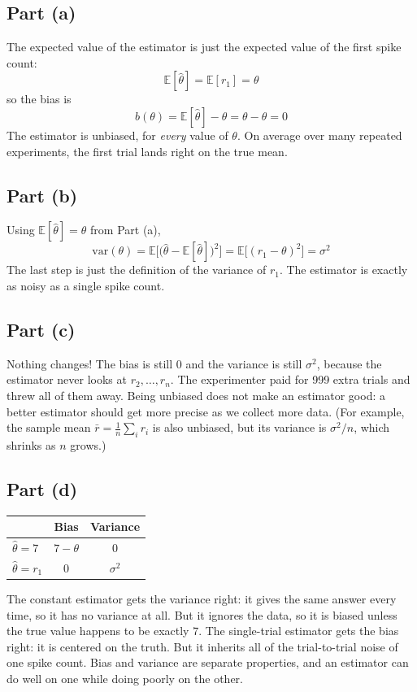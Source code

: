 \documentclass[11pt]{article}
\begin{document}
\subsection*{Part (a)}
The expected value of the estimator is just the expected value of the first spike count:
\[
\mathbb{E}[\hat{\theta}]=\mathbb{E}[r_1]=\theta
\]
so the bias is
\[
b(\theta)=\mathbb{E}[\hat{\theta}]-\theta=\theta-\theta=0
\]
The estimator is unbiased, for \emph{every} value of $\theta$. On average over many repeated experiments, the first trial lands right on the true mean.

\subsection*{Part (b)}
Using $\mathbb{E}[\hat{\theta}]=\theta$ from Part (a),
\[
\mathrm{var}(\theta)=\mathbb{E}\Big[\big(\hat{\theta}-\mathbb{E}[\hat{\theta}]\big)^2\Big]=\mathbb{E}\big[(r_1-\theta)^2\big]=\sigma^2
\]
The last step is just the definition of the variance of $r_1$. The estimator is exactly as noisy as a single spike count.

\subsection*{Part (c)}
Nothing changes! The bias is still $0$ and the variance is still $\sigma^2$, because the estimator never looks at $r_2, \ldots, r_n$. The experimenter paid for 999 extra trials and threw all of them away. Being unbiased does not make an estimator good: a better estimator should get more precise as we collect more data. (For example, the sample mean $\bar{r}=\frac{1}{n}\sum_i r_i$ is also unbiased, but its variance is $\sigma^2/n$, which shrinks as $n$ grows.)

\subsection*{Part (d)}
\begin{center}
\begin{tabular}{lcc}
 & Bias & Variance \\
\hline
$\hat{\theta}=7$ & $7-\theta$ & $0$ \\
$\hat{\theta}=r_1$ & $0$ & $\sigma^2$
\end{tabular}
\end{center}
The constant estimator gets the variance right: it gives the same answer every time, so it has no variance at all. But it ignores the data, so it is biased unless the true value happens to be exactly $7$. The single-trial estimator gets the bias right: it is centered on the truth. But it inherits all of the trial-to-trial noise of one spike count. Bias and variance are separate properties, and an estimator can do well on one while doing poorly on the other.
\end{document}
